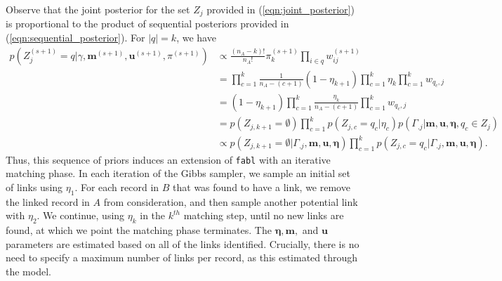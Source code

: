 \documentclass[12pt,letterpaper]{article}
\newcommand{\1}[1]{\mathbb{I}\!\left[#1\right]} %
\begin{document}
Observe that the joint posterior for the set $Z_j$ provided in (\ref{eqn:joint_posterior}) is proportional to the product of sequential posteriors provided in (\ref{eqn:sequential_posterior}). For $|q| = k$, we have
\begin{align*}
	p\left(Z_j^{(s+1)}  = q |\gamma, \bm{m}^{(s+1)}, \bm{u}^{(s+1)}, \pi^{(s+1)}\right) &\propto \frac{(n_A - k)!}{n_A!} \pi_k^{(s+1)} \prod_{i \in q} w_{ij}^{(s+1)} \\
	&= \prod_{c = 1}^k \frac{1}{n_A - (c + 1)} (1 - \eta_{k+1}) \prod_{c = 1}^k \eta_k \prod_{c = 1}^k w_{q_c, j} \\
	&= (1 - \eta_{k+1}) \prod_{c = 1}^k \frac{\eta_k }{n_A - (c + 1)}  \prod_{c = 1}^k w_{q_c, j} \\
	&= p(Z_{j, k+1} = \emptyset) \prod_{c = 1}^k p(Z_{j, c} = q_c|\eta_c) p(\Gamma_{.j}| \bm{m}, \bm{u}, \bm{\eta}, q_c \in Z_j) \\
	&\propto p(Z_{j, k+1} = \emptyset | \Gamma_{.j}, \bm{m}, \bm{u}, \bm{\eta}) \prod_{c = 1}^k p(Z_{j, c} = q_c|\Gamma_{.j}, \bm{m}, \bm{u}, \bm{\eta}).
\end{align*}
Thus, this sequence of priors induces an extension of \texttt{fabl} with an iterative matching phase. In each iteration of the Gibbs sampler, we sample an initial set of links using $\eta_1$. For each record in $B$ that was found to have a link, we remove the linked record in $A$ from consideration, and then sample another potential link with $\eta_2$. We continue, using $\eta_k$ in the $k^{th}$ matching step, until no new links are found, at which we point the matching phase terminates. The $\bm{\eta}, \bm{m},$ and $\bm{u}$ parameters are estimated based on all of the links identified. Crucially, there is no need to specify a maximum number of links per record, as this estimated through the model.

\end{document}
